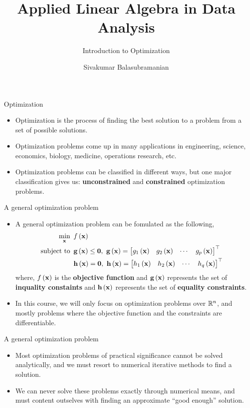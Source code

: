 \documentclass[aspectratio=169]{beamer}
\title{Applied Linear Algebra in Data Analysis}
\subtitle{Introduction to Optimization}
\author{Sivakumar Balasubramanian}
\institute[Christian Medical College] %
{
  \inst{}%
  Department of Bioengineering\\
  Christian Medical College, Bagayam\\
  Vellore 632002
}
\date{}
\let\olditem\item
\renewcommand{\item}{\setlength{\itemsep}{\fill}\olditem}
\def\mf{\ensuremath\mathbf}
\def\mb{\ensuremath\mathbb}
\def\lp{\ensuremath\left(}
\def\rp{\ensuremath\right)}
\def\bmx{\ensuremath\begin{bmatrix*}[r]}
\def\emx{\ensuremath\end{bmatrix*}}
\def\R{\ensuremath\mb{R}}
\newcommand{\ct}[1]{\lp #1\rp}
\begin{document}


\begin{frame}
  \titlepage
\end{frame}


\begin{frame}[t]{Optimization}
\begin{itemize}
  \item Optimization is the process of finding the best solution to a problem from a set of possible solutions.
  \item Optimization problems come up in many applications in engineering, science, economics, biology, medicine, operations research, etc.
  \item Optimization problems can be classified in different ways, but one major classification gives us: \textbf{unconstrained} and \textbf{constrained} optimization problems.
\end{itemize}
\end{frame}


\begin{frame}[t]{A general optimization problem}
\begin{itemize}
  \item A general optimization problem can be fomulated as the following,
  \[ \begin{split}
      \min_{\mf{x}} & \,\,\, f\ct{\mf{x}} \\
      \mathrm{subject \,\, to} & \,\,\, \mf{g}\ct{\mf{x}} \leq \mf{0}, \,\, \mf{g}\ct{\mf{x}} = \bmx g_1\ct{\mf{x}} & g_2\ct{\mf{x}} & \cdots & g_p\ct{\mf{x}}\emx^\top \\
      & \,\,\, \mf{h}\ct{\mf{x}} = \mf{0}, \,\, \mf{h}\ct{\mf{x}} = \bmx h_1\ct{\mf{x}} & h_2\ct{\mf{x}} & \cdots & h_q\ct{\mf{x}}\emx^\top \\
  \end{split} \]
  where, $f\ct{\mf{x}}$ is the \textbf{objective function} and $\mf{g}\ct{\mf{x}}$ represents the set of \textbf{inquality constaints} and $\mf{h}\ct{\mf{x}}$ represents the set of \textbf{equality constraints}.

  \item In this course, we will only focus on optimization problems over $\R^n$, and mostly problems where the objective function and the constraints are differentiable.
\end{itemize}
\end{frame}


\begin{frame}[t]{A general optimization problem}
\begin{itemize}
  \item Most optimization problems of practical significance cannot be solved analytically, and we must resort to numerical iterative methods to find a solution.
  
  \item We can never solve these problems exactly through numerical means, and must content outselves with finding an approximate ``good enough'' solution.
\end{itemize}
\end{frame}
\end{document}
